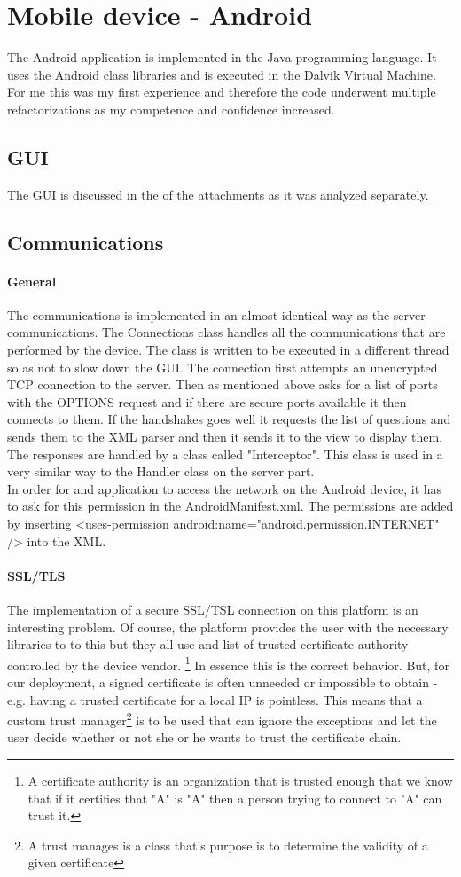 \documentclass[11pt,twoside,a4paper]{book}
\begin{document}
\section{Mobile device - Android}
The Android application is implemented in the Java programming language. It uses the Android class libraries and is executed in the Dalvik Virtual Machine. For me this was my first experience and therefore the code underwent multiple refactorizations as my competence and confidence increased.
\subsection{GUI} 
The GUI is discussed in the of the attachments as it was analyzed separately.
\subsection{Communications}
\paragraph{General}The communications is implemented in an almost identical way as the server communications. The Connections class handles all the communications that are performed by the device. The class is written to be executed in a different thread so as not to slow down the GUI. The connection first attempts an unencrypted TCP connection to the server. Then as mentioned above asks for a list of ports with the OPTIONS request and if there are secure ports available it then connects to them. If the handshakes goes well it requests the list of questions and sends them to the XML parser and then it sends it to the view to display them. The responses are handled by a class called "Interceptor". This class is used in a very similar way to the Handler class on the server part.\\
In order for and application to access the network on the Android device, it has to ask for this permission in the AndroidManifest.xml. The permissions are added by inserting <uses-permission android:name="android.permission.INTERNET" /> into the XML.
\paragraph{SSL/TLS}
The implementation of a secure SSL/TSL connection on this platform is an interesting problem. Of course, the platform provides the user with the necessary libraries to to this but they all use and  list of trusted certificate authority controlled by the device vendor. \footnote{A certificate authority is an organization that is trusted enough that we know that if it certifies that "A" is "A" then a person trying to connect to "A" can trust it.} In essence this is the correct behavior. But, for our deployment, a signed certificate is often unneeded or impossible to obtain - e.g. having a trusted certificate for a local IP is pointless. This means that a custom trust manager\footnote{A trust manages is a class that's purpose is to determine the validity of a given certificate}  is to be used that can ignore the exceptions and let the user decide whether or not she or he wants to trust the certificate chain.
\end{document}
